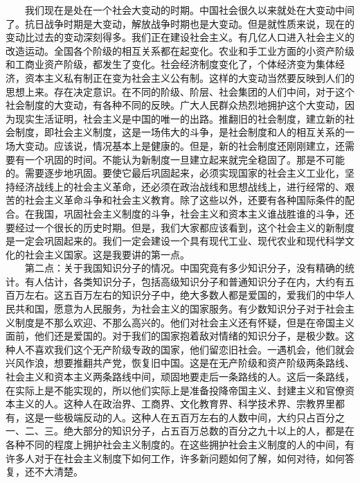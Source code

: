 \documentclass[cn,11pt,chinese]{elegantbook}
\begin{document}
　　我们现在是处在一个社会大变动的时期。中国社会很久以来就处在大变动中间了。抗日战争时期是大变动，解放战争时期也是大变动。但是就性质来说，现在的变动比过去的变动深刻得多。我们正在建设社会主义。有几亿人口进入社会主义的改造运动。全国各个阶级的相互关系都在起变化。农业和手工业方面的小资产阶级和工商业资产阶级，都发生了变化。社会经济制度变化了，个体经济变为集体经济，资本主义私有制正在变为社会主义公有制。这样的大变动当然要反映到人们的思想上来。存在决定意识。在不同的阶级、阶层、社会集团的人们中间，对于这个社会制度的大变动，有各种不同的反映。广大人民群众热烈地拥护这个大变动，因为现实生活证明，社会主义是中国的唯一的出路。推翻旧的社会制度，建立新的社会制度，即社会主义制度，这是一场伟大的斗争，是社会制度和人的相互关系的一场大变动。应该说，情况基本上是健康的。但是，新的社会制度还刚刚建立，还需要有一个巩固的时间。不能认为新制度一旦建立起来就完全稳固了。那是不可能的。需要逐步地巩固。要使它最后巩固起来，必须实现国家的社会主义工业化，坚持经济战线上的社会主义革命，还必须在政治战线和思想战线上，进行经常的、艰苦的社会主义革命斗争和社会主义教育。除了这些以外，还要有各种国际条件的配合。在我国，巩固社会主义制度的斗争，社会主义和资本主义谁战胜谁的斗争，还要经过一个很长的历史时期。但是，我们大家都应该看到，这个社会主义的新制度是一定会巩固起来的。我们一定会建设一个具有现代工业、现代农业和现代科学文化的社会主义国家。这是我要讲的第一点。\\
　　第二点：关于我国知识分子的情况。中国究竟有多少知识分子，没有精确的统计。有人估计，各类知识分子，包括高级知识分子和普通知识分子在内，大约有五百万左右。这五百万左右的知识分子中，绝大多数人都是爱国的，爱我们的中华人民共和国，愿意为人民服务，为社会主义的国家服务。有少数知识分子对于社会主义制度是不那么欢迎、不那么高兴的。他们对社会主义还有怀疑，但是在帝国主义面前，他们还是爱国的。对于我们的国家抱着敌对情绪的知识分子，是极少数。这种人不喜欢我们这个无产阶级专政的国家，他们留恋旧社会。一遇机会，他们就会兴风作浪，想要推翻共产党，恢复旧中国。这是在无产阶级和资产阶级两条路线、社会主义和资本主义两条路线中间，顽固地要走后一条路线的人。这后一条路线，在实际上是不能实现的，所以他们实际上是准备投降帝国主义、封建主义和官僚资本主义的人。这种人在政治界、工商界、文化教育界、科学技术界、宗教界里都有，这是一些极端反动的人。这种人在五百万左右的人数中间，大约只占百分之一、二、三。绝大部分的知识分子，占五百万总数的百分之九十以上的人，都是在各种不同的程度上拥护社会主义制度的。在这些拥护社会主义制度的人的中间，有许多人对于在社会主义制度下如何工作，许多新问题如何了解，如何对待，如何答复，还不大清楚。\\
\end{document}
